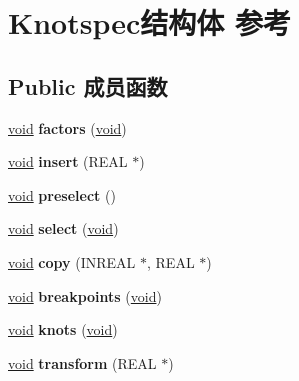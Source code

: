 \hypertarget{struct_knotspec}{}\section{Knotspec结构体 参考}
\label{struct_knotspec}
\subsection*{Public 成员函数}
\begin{DoxyCompactItemize}
\item 
\mbox{\label{struct_knotspec_a55604b46052323ddbcde03947e87f97e}} 
\hyperlink{interfacevoid}{void} {\bfseries factors} (\hyperlink{interfacevoid}{void})
\item 
\mbox{\label{struct_knotspec_a9b9c50fb1c79c53eb0608b4a03465376}} 
\hyperlink{interfacevoid}{void} {\bfseries insert} (R\+E\+AL $\ast$)
\item 
\mbox{\label{struct_knotspec_ae888231f13e3ce06f16b9fcf6f172b34}} 
\hyperlink{interfacevoid}{void} {\bfseries preselect} ()
\item 
\mbox{\label{struct_knotspec_ab421001f50d650ab54b965efc9a9d1b7}} 
\hyperlink{interfacevoid}{void} {\bfseries select} (\hyperlink{interfacevoid}{void})
\item 
\mbox{\label{struct_knotspec_a7eb05d144450e795d26762dc82bbcdbf}} 
\hyperlink{interfacevoid}{void} {\bfseries copy} (I\+N\+R\+E\+AL $\ast$, R\+E\+AL $\ast$)
\item 
\mbox{\label{struct_knotspec_a83e66c5faf6bf2c6bdd51f1e151097bc}} 
\hyperlink{interfacevoid}{void} {\bfseries breakpoints} (\hyperlink{interfacevoid}{void})
\item 
\mbox{\label{struct_knotspec_a1294ed5d99bab9158f95f19b0c035b79}} 
\hyperlink{interfacevoid}{void} {\bfseries knots} (\hyperlink{interfacevoid}{void})
\item 
\mbox{\label{struct_knotspec_a4218209334e74ba35a91bd7e1ac19c73}} 
\hyperlink{interfacevoid}{void} {\bfseries transform} (R\+E\+AL $\ast$)
\item 

\end{DoxyCompactItemize}
